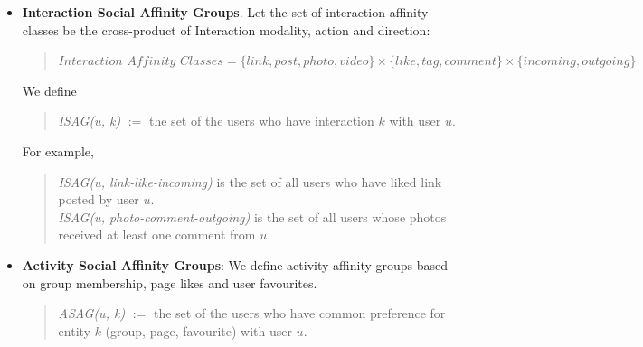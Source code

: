 \begin{itemize}
  \item \textbf{Interaction  Social Affinity Groups}. Let the set of interaction affinity classes be the cross-product of 
  Interaction modality, action and direction:
  \begin{quote}
  \begin{math}
  	\textit{Interaction Affinity Classes} = \{link, post, photo, video\} \times \{like, tag, comment\} \times \{incoming, outgoing\}
  \end{math}
  \end{quote}
  We define 
  \begin{quote}
  \textit{ISAG(u, k)} $:=$ the set of the users who have interaction $k$ with user $u$.
  \end{quote}
   For example,
   \begin{quote}
   
   \textit{ISAG(u, link-like-incoming)}  is the set of all users who have liked link posted by user $u$. \\
   \textit{ISAG(u, photo-comment-outgoing)} is the set of all users whose photos received at least one comment from $u$. \\
   \end{quote}
\item \textbf{Activity Social Affinity Groups}: We define activity affinity groups based on group membership, page likes and user favourites.
	\begin{quote}
	\textit{ASAG(u, k)} $:=$ the set of the users who have common preference for entity $k$ (group, page, favourite) with user $u$.   
	\end{quote}
\end{itemize}


